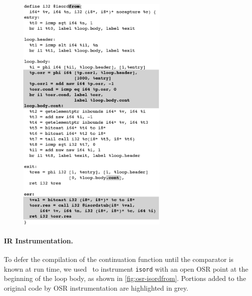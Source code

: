 \ifdefined\noauthorea
\begin{figure}[!ht]
\begin{center}
\includegraphics[width=0.66\textwidth]{figures/osr-isordfrom/osr-isordfrom.eps}
\caption{\protect}
\end{center}
\vspace{-2mm}
\end{figure}
\fi

\paragraph*{IR Instrumentation.}
To defer the compilation of the continuation function until the comparator is known at run time, we used \osrkit\ to instrument {\tt isord} with an open OSR point at the beginning of the loop body, as shown in \myfigure\ref{fig:osr-isordfrom}. Portions added to the original code by OSR instrumentation are highlighted in grey.

